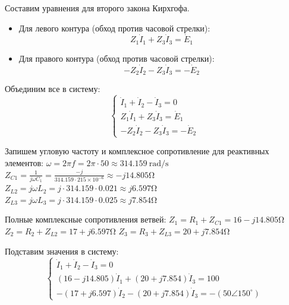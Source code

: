 \documentclass[14pt, a4paper]{styles/gost-7-32} %
\begin{document}
Составим уравнения для второго закона Кирхгофа.
\begin{itemize}
    \item Для левого контура (обход против часовой стрелки):
      \begin{equation}
          Z_1 \dot{I}_1 + Z_3 \dot{I}_3 = \dot{E}_1
          \label{eq:kirchhoff2_2}
      \end{equation}
    \item Для правого контура (обход против часовой стрелки):
      \begin{equation}
          -Z_2 \dot{I}_2 - Z_3 \dot{I}_3 = -\dot{E}_2
          \label{eq:kirchhoff2_3}
      \end{equation}
\end{itemize}
Объединим все в систему:
\begin{equation}
    \begin{cases}
        \dot{I}_1 + \dot{I}_2 - \dot{I}_3 = 0 \\
        Z_1 \dot{I}_1 + Z_3 \dot{I}_3 = \dot{E}_1 \\
        -Z_2 \dot{I}_2 - Z_3 \dot{I}_3 = -\dot{E}_2
    \end{cases}
    \label{eq:system_kirchhoff2}
\end{equation}

Запишем угловую частоту и комплексное сопротивление для реактивных элементов:
$\omega = 2 \pi f = 2 \pi \cdot 50 \approx \SI{314.159}{\radian\per\second}$
$Z_{C1} = \frac{1}{j\omega C_1} = \frac{-j}{314.159 \cdot 215 \times 10^{-6}} \approx -j \num{14.805} \si{\ohm}$
$Z_{L2} = j \omega L_2 = j \cdot 314.159 \cdot 0.021 \approx j \num{6.597} \si{\ohm}$
$Z_{L3} = j \omega L_3 = j \cdot 314.159 \cdot 0.025 \approx j \num{7.854} \si{\ohm}$

Полные комплексные сопротивления ветвей:
$Z_1 = R_1 + Z_{C1} = 16 - j 14.805 \si{\ohm}$
$Z_2 = R_2 + Z_{L2} = 17 + j 6.597 \si{\ohm}$
$Z_3 = R_3 + Z_{L3} = 20 + j 7.854 \si{\ohm}$

Подставим значения в систему:
\begin{equation*}
    \begin{cases}
        \dot{I}_1 + \dot{I}_2 - \dot{I}_3 = 0 \\
        (16 - j 14.805) \dot{I}_1 + (20 + j 7.854) \dot{I}_3 = 100 \\
        -(17 + j 6.597) \dot{I}_2 - (20 + j 7.854) \dot{I}_3 = - (50 \angle 150^\circ)
    \end{cases}
\end{equation*}
\end{document}
